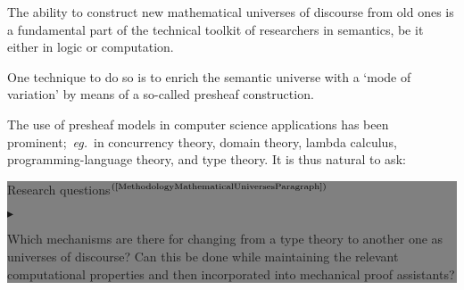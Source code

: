 \documentclass[11pt,twocolumn]{article}
\newenvironment{btritemize}
  {\begin{list}{\btr}
  {\setlength{\topsep}{2pt}
   \setlength{\partopsep}{2pt}
   \setlength{\itemsep}{2.5pt}
   \setlength{\parsep}{2.5pt}
   \setlength{\leftmargin}{1em}
   \setlength{\labelwidth}{.5em}}}
  {\end{list}}
\newcommand{\mytextsf}[1]{\textsf{\small #1}}
\newcommand{\eg}{\emph{eg.}}
\newcommand{\btr}{$\blacktriangleright$}
\newcommand{\reqpsize}{8.113395cm}%
\newcommand{\reqs}[2]{\begin{center}\colorbox{grey}{\begin{minipage}{\reqpsize}
  \mytextsf{Research questions}\hfill$^{\mbox{\scriptsize #1 }}$\\[-5.5mm]
  \begin{btritemize}
  \item #2
  \end{btritemize}
\end{minipage}}\end{center}}
\newcommand{\Set}{{\boldsymbol{\mathscr S}}}
\newcommand{\scat}[1]{\mathbb{#1}}
\begin{document}
The ability to construct new mathematical universes of discourse from old ones
is a fundamental part of the technical toolkit of researchers in semantics, be
it either in logic or computation.

One technique to do so is to enrich the semantic universe with a `mode of
variation' by means of a so-called presheaf construction.  


The use of presheaf models in computer science applications has been
prominent;~\eg~in 
concurrency theory, %
domain theory, %
lambda calculus, %
programming-language theory, %
and type theory. %
%
It is thus %
natural to ask:
\reqs{(\ref{MethodologyMathematicalUniversesParagraph})}
  {Which mechanisms are there for changing from a type theory to another one
    as universes of discourse? 
%
    Can this be done while maintaining the relevant computational properties
    and then incorporated into mechanical proof assistants?}


\end{document}
